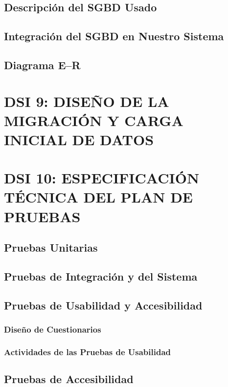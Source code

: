 \documentclass[11pt]{report}
\begin{document}
\subsection{Descripción del SGBD Usado} 

\subsection{Integración del SGBD en Nuestro Sistema} 

\subsection{Diagrama E--R} 


\newpage
\section{DSI 9: DISEÑO DE LA MIGRACIÓN Y CARGA INICIAL DE DATOS}


\newpage
\section{DSI 10: ESPECIFICACIÓN TÉCNICA DEL PLAN DE PRUEBAS}

\subsection{Pruebas Unitarias} 

\subsection{Pruebas de Integración y del Sistema} 

\subsection{Pruebas de Usabilidad y Accesibilidad} 

\subsubsection{Diseño de Cuestionarios} 

\subsubsection{Actividades de las Pruebas de Usabilidad} 


\subsection{Pruebas de Accesibilidad} 
\end{document}
